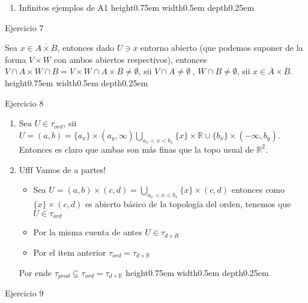 \documentclass[11pt]{article}
\newcommand{\R}{{\mathbb{R}}}
\newcommand{\sett}[1]{\{#1\}}
\newenvironment{proof}[1][Demostraci\'on]{\begin{trivlist}
\item[\hskip \labelsep {\bfseries #1}]}{\end{trivlist}}
\newcommand{\qed}{\nobreak \ifvmode \relax \else
      \ifdim\lastskip<1.5em \hskip-\lastskip
      \hskip1.5em plus0em minus0.5em \fi \nobreak
      \vrule height0.75em width0.5em depth0.25em\fi}
\begin{document}
\begin{enumerate}
\begin{proof}
\begin{enumerate}
\item Infinitos ejemplos de A1 \qed

\end{enumerate}
\end{proof}

\item {Ejercicio 7}

\begin{proof}

Sea $x \in \overline{A \times B}$, entonces dado $U \ni x$ entorno abierto (que podemos suponer de la forma $V \times W$ con ambos abiertos respectivos), entonces $V \cap A \times W \cap B =V \times W \cap A \times B \neq \emptyset$, sii $V \cap A \neq \emptyset \ , \ W \cap B \neq \emptyset$, sii $x \in \overline{A} \times \overline{B}$. \qed

\end{proof}

\item {Ejercicio 8}

\begin{proof}

\begin{enumerate}

\item Sea $U \in \tau_{ord}$, sii $U = (a,b) = {\sett{a_x} \times (a_y,\infty)} \bigcup_{a_x <x< b_x} {\sett{x} \times \R} \cup \sett{b_x} \times (-\infty,b_y)$. Entonces es claro que ambas son m\'as finas que la topo usual de $\R^2$.

\item Ufff Vamos de a partes!

\begin{itemize}

\item Sea $U = (a,b) \times (c,d) = \bigcup_{a_x < x < b_x} { \sett{x} \times (c,d)}$ entonces como $\sett{x} \times (c,d)$ es abierto b\'asico de la topolog\'ia del orden, tenemos que $U \in \tau_{ord}$
\item Por la misma cuenta de antes $U \in \tau_{d \times R}$
\item Por el item anterior $\tau_{ord} = \tau_{d \times \R}$ 
\end{itemize}

Por ende $\tau_{prod} \subsetneq \tau_{ord} = \tau_{d \times \R}$ \qed
\end{enumerate}

\end{proof}

\item {Ejercicio 9}


\end{enumerate}
\end{document}
